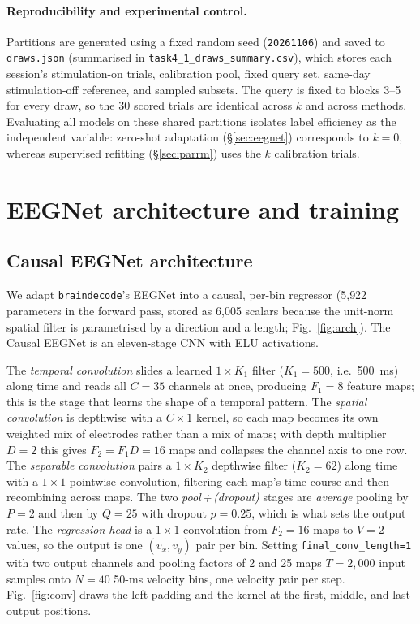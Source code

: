 \documentclass{article}
\begin{document}
\paragraph{Reproducibility and experimental control.} 
Partitions are generated using a fixed random seed (\texttt{20261106}) and saved to \texttt{draws.json} (summarised in \texttt{task4\_1\_draws\_summary.csv}), which stores each session's stimulation-on trials, calibration pool, fixed query set, same-day stimulation-off reference, and sampled subsets. The query is fixed to blocks 3--5 for every draw, so the 30 scored trials are identical across $k$ and across methods. Evaluating all models on these shared partitions isolates label efficiency as the independent variable: zero-shot adaptation (\S\ref{sec:eegnet}) corresponds to $k=0$, whereas supervised refitting (\S\ref{sec:parrm}) uses the $k$ calibration trials.



\section{EEGNet architecture and training}\label{app:arch}

\subsection{Causal EEGNet architecture}\label{sec:arch}
We adapt \texttt{braindecode}'s EEGNet into a causal, per-bin regressor (5{,}922 parameters in the forward pass, stored as 6{,}005 scalars because the unit-norm spatial filter is parametrised by a direction and a length; Fig.~\ref{fig:arch}). The Causal EEGNet is an eleven-stage CNN with ELU activations.

The \emph{temporal convolution} slides a learned $1\times K_1$ filter ($K_1=500$, i.e.\ 500~ms) along time and reads all $C=35$ channels at once, producing $F_1=8$ feature maps; this is the stage that learns the shape of a temporal pattern. The \emph{spatial convolution} is depthwise with a $C\times1$ kernel, so each map becomes its own weighted mix of electrodes rather than a mix of maps; with depth multiplier $D=2$ this gives $F_2=F_1D=16$ maps and collapses the channel axis to one row. The \emph{separable convolution} pairs a $1\times K_2$ depthwise filter ($K_2=62$) along time with a $1\times1$ pointwise convolution, filtering each map's time course and then recombining across maps. The two \emph{pool\,+\,(dropout)} stages are \emph{average} pooling by $P=2$ and then by $Q=25$ with dropout $p=0.25$, which is what sets the output rate. The \emph{regression head} is a $1\times1$ convolution from $F_2=16$ maps to $V=2$ values, so the output is one $(v_x,v_y)$ pair per bin. Setting \texttt{final\_conv\_length=1} with two output channels and pooling factors of 2 and 25 maps $T=2{,}000$ input samples onto $N=40$ 50-ms velocity bins, one velocity pair per step. Fig.~\ref{fig:conv} draws the left padding and the kernel at the first, middle, and last output positions.
\end{document}
